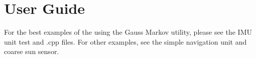 \section{User Guide}
For the best examples of the using the Gauss Markov utility, please see the IMU unit test and .cpp files. For other examples, see the simple navigation unit and coarse sun sensor.